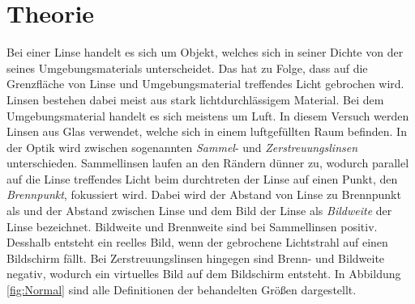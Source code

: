 
\section{Theorie}
\label{sec:Theorie}
Bei einer Linse handelt es sich um Objekt, welches sich in seiner Dichte von der seines Umgebungsmaterials unterscheidet. Das hat zu Folge, dass auf die Grenzfläche von Linse und Umgebungsmaterial treffendes Licht gebrochen wird. Linsen bestehen dabei meist aus stark lichtdurchlässigem Material. Bei dem Umgebungsmaterial handelt es sich meistens um Luft. In diesem Versuch werden Linsen aus Glas verwendet, welche sich in einem luftgefüllten Raum befinden. In der Optik wird zwischen sogenannten \textit{Sammel}- und \textit{Zerstreuungslinsen} unterschieden. Sammellinsen laufen an den Rändern dünner zu, wodurch parallel auf die Linse treffendes Licht beim durchtreten der Linse auf einen Punkt, den \textit{Brennpunkt}, fokussiert wird. Dabei wird der Abstand von Linse zu Brennpunkt als  und der Abstand zwischen Linse und dem Bild der Linse als \textit{Bildweite} der Linse bezeichnet. Bildweite und Brennweite sind bei Sammellinsen positiv. Desshalb entsteht ein reelles Bild, wenn der gebrochene Lichtstrahl auf einen Bildschirm fällt. Bei Zerstreuungslinsen hingegen sind Brenn- und Bildweite negativ, wodurch ein virtuelles Bild auf dem Bildschirm entsteht. In Abbildung \ref{fig:Normal} sind alle Definitionen der behandelten Größen dargestellt. 

